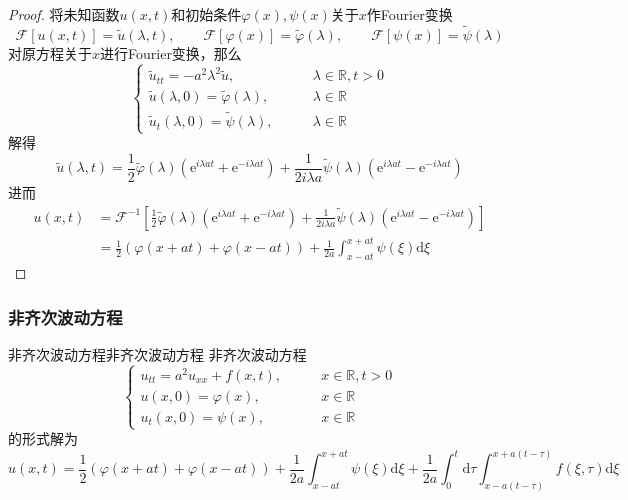 \documentclass[lang = cn, scheme = chinese, thmcnt = section]{elegantbook}
\newcommand{\R}{\mathbb{R}}            %
\newcommand{\dd}{\mathrm{d}}           %
\newcommand{\ee}[1]{\mathrm{e}^{#1}}   %
\begin{document}
\begin{proof}
	将未知函数$u(x,t)$和初始条件$\varphi(x),\psi(x)$关于$x$作Fourier变换%
	$$
	\mathscr{F}[u(x,t)]=\tilde{u}(\lambda,t),\qquad
	\mathscr{F}[\varphi(x)]=\tilde{\varphi}(\lambda) ,\qquad 
	\mathscr{F}[\psi(x)]=\tilde{\psi}(\lambda)
	$$
	对原方程关于$x$进行Fourier变换，那么
	$$
	\begin{cases}
		\tilde{u}_{tt}=-a^2\lambda^2\tilde{u},\qquad & \lambda\in\R,t>0\\
		\tilde{u}(\lambda,0)=\tilde{\varphi}(\lambda),\qquad & \lambda\in\R\\
		\tilde{u}_t(\lambda,0)=\tilde{\psi}(\lambda),\qquad & \lambda\in\R
	\end{cases}
	$$
	解得%
	$$
	\tilde{u}(\lambda,t)
	=\frac{1}{2}\tilde{\varphi}(\lambda)(\ee{i\lambda a t}+\ee{-i\lambda a t})+
	\frac{1}{2i\lambda a}\tilde{\psi}(\lambda)(\ee{i\lambda a t}-\ee{-i\lambda a t})
	$$
	进而
	\begin{align*}
		u(x,t)
		& = \mathscr{F}^{-1}\left[\frac{1}{2}\tilde{\varphi}(\lambda)(\ee{i\lambda a t}+\ee{-i\lambda a t})+
		\frac{1}{2i\lambda a}\tilde{\psi}(\lambda)(\ee{i\lambda a t}-\ee{-i\lambda a t})\right]\\
		& = \frac{1}{2}(\varphi(x+at)+\varphi(x-at))+\frac{1}{2a}\int_{x-at}^{x+at}\psi(\xi)\dd\xi
	\end{align*}
\end{proof}

\subsubsection{非齐次波动方程}

\begin{theorem}{非齐次波动方程}{非齐次波动方程}
	非齐次波动方程
	$$
	\begin{cases}
		u_{tt}=a^2u_{xx}+f(x,t),\qquad & x\in\R,t>0\\
		u(x,0)=\varphi(x),\qquad & x\in\R\\
		u_t(x,0)=\psi(x),\qquad & x\in\R
	\end{cases}
	$$
	的形式解为
	$$
	u(x,t)
	= \frac{1}{2}(\varphi(x+at)+\varphi(x-at))+\frac{1}{2a}\int_{x-at}^{x+at}\psi(\xi)\dd\xi+\frac{1}{2a}\int_{0}^{t}\dd\tau\int_{x-a(t-\tau)}^{x+a(t-\tau)}f(\xi,\tau)\dd\xi
	$$
\end{theorem}
\end{document}
